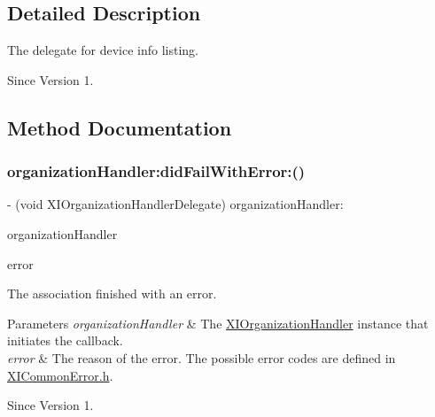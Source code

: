 \subsection{Detailed Description}
The delegate for device info listing. 

\begin{DoxySince}{Since}
Version 1. 
\end{DoxySince}


\subsection{Method Documentation}
\hypertarget{protocol_x_i_organization_handler_delegate_01-p_a2731d197e18e9b397a7ee33e46c35fb1}{}\label{protocol_x_i_organization_handler_delegate_01-p_a2731d197e18e9b397a7ee33e46c35fb1} 
\subsubsection{\texorpdfstring{organization\+Handler\+:did\+Fail\+With\+Error\+:()}{organizationHandler:didFailWithError:()}}
{\footnotesize\ttfamily -\/ (void X\+I\+Organization\+Handler\+Delegate) organization\+Handler\+: \begin{DoxyParamCaption}\item[{(id$<$ X\+I\+Organization\+Handler $>$)}]{organization\+Handler }\item[{didFailWithError:(N\+S\+Error $\ast$)}]{error }\end{DoxyParamCaption}}



The association finished with an error. 


\begin{DoxyParams}{Parameters}
{\em organization\+Handler} & The \hyperlink{class_x_i_organization_handler-p}{X\+I\+Organization\+Handler} instance that initiates the callback. \\
\hline
{\em error} & The reason of the error. The possible error codes are defined in \hyperlink{_x_i_common_error_8h}{X\+I\+Common\+Error.\+h}. \\
\hline
\end{DoxyParams}
\begin{DoxySince}{Since}
Version 1. 
\end{DoxySince}
\hypertarget{protocol_x_i_organization_handler_delegate_01-p_a31f995db2b5e2e00169950a217ad6475}{}\label{protocol_x_i_organization_handler_delegate_01-p_a31f995db2b5e2e00169950a217ad6475} 
